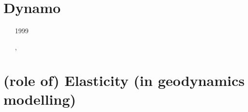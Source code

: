 \section{Dynamo}

\begin{small}
\begin{itemize}
\item[1999] 
\item[\twothousandfive] 
\item[\twothousandnine] 
\item[\twothousandeleven] 
\item[\twothousandthirteen] , 
\item[\twothousandsixteen] 
\end{itemize}
\end{small}

\section{(role of) Elasticity (in geodynamics modelling)}

